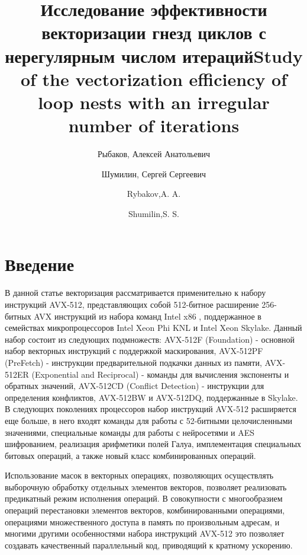 \documentclass[utf8]{psta}
\title[исследование эффективности векторизации]{Исследование эффективности векторизации гнезд циклов с нерегулярным числом итераций}
\author{Рыбаков, Алексей Анатольевич}
\author{Шумилин, Сергей Сергеевич}
\title[Study of the vectorization efficiency]{Study of the vectorization efficiency of loop nests with an irregular number of iterations}
\author{Rybakov,A. A.}
\author{Shumilin,S. S.}
\begin{document}
           
\maketitle   

\section*{Введение}

В данной статье векторизация рассматривается применительно к набору инструкций AVX-512, представляющих собой 512-битное расширение 256-битных AVX инструкций из набора команд Intel x86 \cite{intel_manual}, поддержанное в семействах микропроцессоров Intel Xeon Phi KNL \cite{Jeffers} и Intel Xeon Skylake. 
Данный набор состоит из следующих подмножеств: AVX-512F (Foundation) - основной набор векторных инструкций с поддержкой маскирования, AVX-512PF (PreFetch) - инструкции предварительной подкачки данных из памяти, AVX-512ER (Exponential and Reciprocal) - команды для вычисления экспоненты и обратных значений, AVX-512CD (Conflict Detection) - инструкции для определения конфликтов, AVX-512BW и AVX-512DQ, поддержанные в Skylake. 
В следующих поколениях процессоров набор инструкций AVX-512 расширяется еще больше, в него входят команды для работы с 52-битными целочисленными значениями, специальные команды для работы с нейросетями и AES шифрованием, реализация арифметики полей Галуа, имплементация специальных битовых операций, а также новый класс комбинированных операций.

Использование масок в векторных операциях, позволяющих осуществлять выборочную обработку отдельных элементов векторов, позволяет реализовать предикатный режим исполнения операций. 
В совокупности с многообразием операций перестановки элементов векторов, комбинированными операциями, операциями множественного доступа в память по произвольным адресам, и многими другими особенностями набора инструкций AVX-512 это позволяет создавать качественный параллельный код, приводящий к кратному ускорению.
\end{document}
